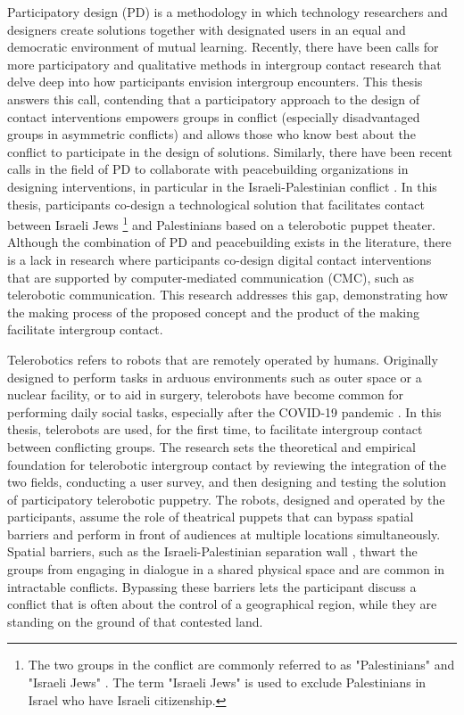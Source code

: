 \documentclass[dissertation,math,vertlayout,pdfa,colorlinks]{aaltoseries}
\begin{document}
Participatory design (PD) \cite{disalvoCommunitiesParticipatoryDesign2012} is a methodology in which technology researchers and designers create solutions together with designated users in an equal and democratic environment of mutual learning. Recently, there have been calls for more participatory and qualitative methods in intergroup contact research \cite{dixonNegativeContactCollective2021} that delve deep into how participants envision intergroup encounters. This thesis answers this call, contending that a participatory approach to the design of contact interventions empowers groups in conflict (especially disadvantaged groups in asymmetric conflicts) and allows those who know best about the conflict to participate in the design of solutions. Similarly, there have been recent calls in the field of PD to collaborate with peacebuilding organizations in designing interventions, in particular in the Israeli-Palestinian conflict \cite{bodkerAfterthoughtsEmergentFuture2025}. In this thesis, participants co-design a technological solution that facilitates contact between Israeli Jews \footnote{The two groups in the conflict are commonly referred to as "Palestinians" and "Israeli Jews" \cite{maozDoesContactWork2011}. The term "Israeli Jews" is used to exclude Palestinians in Israel who have Israeli citizenship.} and Palestinians based on a telerobotic puppet theater. Although the combination of PD and peacebuilding exists in the literature, there is a lack in research where participants co-design digital contact interventions that are supported by computer-mediated communication (CMC), such as telerobotic communication. This research addresses this gap, demonstrating how the making process of the proposed concept and the product of the making facilitate intergroup contact.

Telerobotics \cite{sheridanTeleoperationTeleroboticsTelepresence1995} refers to robots that are remotely operated by humans. Originally designed to perform tasks in arduous environments such as outer space or a nuclear facility, or to aid in surgery, telerobots have become common for performing daily social tasks, especially after the COVID-19 pandemic \cite{shenRobotsCOVID19Pandemic2021}. In this thesis, telerobots are used, for the first time, to facilitate intergroup contact between conflicting groups. The research sets the theoretical and empirical foundation for telerobotic intergroup contact by reviewing the integration of the two fields, conducting a user survey, and then designing and testing the solution of participatory telerobotic puppetry. The robots, designed and operated by the participants, assume the role of theatrical puppets that can bypass spatial barriers and perform in front of audiences at multiple locations simultaneously. Spatial barriers, such as the Israeli-Palestinian separation wall \cite{weizmanHollowLandIsraels2012}, thwart the groups from engaging in dialogue in a shared physical space and are common in intractable conflicts. Bypassing these barriers lets the participant discuss a conflict that is often about the control of a geographical region, while they are standing on the ground of that contested land.
\end{document}
